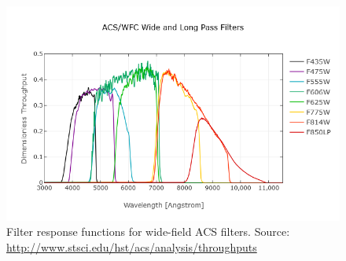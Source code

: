 \documentclass[12pt, a4paper]{report}
\begin{document}
\begin{figure}[h]
\begin{center}
\includegraphics[scale=0.5]{ACS_Wide.png}
\caption{Filter response functions for wide-field ACS filters. Source: \protect\url{http://www.stsci.edu/hst/acs/analysis/throughputs}}
\label{ACS_response_funcs}
\end{center}
\end{figure}
\end{document}
